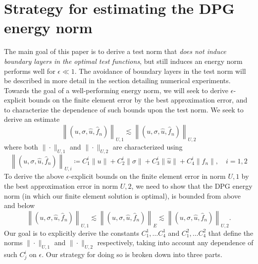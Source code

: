 \documentclass[11pt,onecolumn]{scrartcl}
\begin{document}
\section{Strategy for estimating the DPG energy norm}

The main goal of this paper is to derive a test norm that \textit{does not induce boundary layers in the optimal test functions}, but still induces an energy norm performs well for $\epsilon \ll 1$.  The avoidance of boundary layers in the test norm will be described in more detail in the section detailing numerical experiments.  Towards the goal of a well-performing energy norm, we will seek to derive $\epsilon$-explicit bounds on the finite element error by the best approximation error, and to characterize the dependence of such bounds upon the test norm.  We seek to derive an estimate
\[
\left\| \left(u,\sigma,\widehat{u},\widehat{f}_n\right)\right \|_{U,1} \lesssim \left\| \left(u,\sigma,\widehat{u},\widehat{f}_n\right)\right \|_{U,2}
\]
where both $\|\cdot\|_{U,1}$ and $\|\cdot\|_{U,2}$ are characterized using
\[
\left\| \left(u,\sigma,\widehat{u},\widehat{f}_n\right)\right \|_{U,i} \coloneqq C_1^i\|u\| + C_2^i\|\sigma\| + C_3^i\|\widehat{u}\| + C_4^i\|\widehat{f}_n\|,\quad i = 1,2
\]
To derive the above $\epsilon$-explicit bounds on the finite element error in norm $U,1$ by the best approximation error in norm $U,2$, we need to show that the DPG energy norm (in which our finite element solution is optimal), is bounded from above and below 
\[
\left\| \left(u,\sigma,\widehat{u},\widehat{f}_n\right)\right \|_{U,1} \lesssim  \left\| \left(u,\sigma,\widehat{u},\widehat{f}_n\right)\right \|_E \lesssim \left\| \left(u,\sigma,\widehat{u},\widehat{f}_n\right)\right \|_{U,2}.
\]
Our goal is to explicitly derive the constants $C^1_1,\ldots C^1_4$ and $C^2_1,\ldots C^2_4$ that define the norms $\|\cdot\|_{U,1}$ and $\|\cdot\|_{U,2}$ respectively, taking into account any dependence of such $C^i_j$ on $\epsilon$.  Our strategy for doing so is broken down into three parts.  
\end{document}
